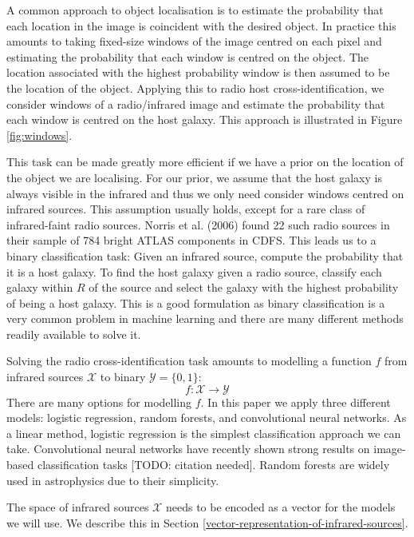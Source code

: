 \documentclass[fleqn,usenatbib,usedcolumn]{mnras}
\begin{document}
    A common approach to object localisation is to estimate the probability
    that each location in the image is coincident with the desired object. In
    practice this amounts to taking fixed-size windows of the image centred on
    each pixel and estimating the probability that each window is centred on
    the object. The location associated with the highest probability window is
    then assumed to be the location of the object. Applying this to radio host
    cross-identification, we consider windows of a radio/infrared image and
    estimate the probability that each window is centred on the host galaxy.
    This approach is illustrated in Figure \ref{fig:windows}.

    This task can be made greatly more efficient if we have a prior on the
    location of the object we are localising. For our prior, we assume that
    the host galaxy is always visible in the infrared and thus we only need
    consider windows centred on infrared sources. This assumption usually
    holds, except for a rare class of infrared-faint radio sources. Norris et
    al. (2006) found 22 such radio sources in their sample of 784 bright ATLAS
    components in CDFS. This leads us to a binary classification task: Given
    an infrared source, compute the probability that it is a host galaxy. To
    find the host galaxy given a radio source, classify each galaxy within
    \(R\) of the source and select the galaxy with the highest probability of
    being a host galaxy. This is a good formulation as binary classification
    is a very common problem in machine learning and there are many different
    methods readily available to solve it.

    Solving the radio cross-identification task amounts to modelling a
    function \(f\) from infrared sources \(\mathcal{X}\) to binary
    \(\mathcal{Y} = \{0, 1\}\): \[
        f : \mathcal{X} \to \mathcal{Y}
    \] There are many options for modelling \(f\). In this paper we apply
    three different models: logistic regression, random forests, and
    convolutional neural networks. As a linear method, logistic regression is
    the simplest classification approach we can take. Convolutional neural
    networks have recently shown strong results on image-based classification
    tasks [TODO: citation needed]. Random forests are widely used in
    astrophysics due to their simplicity.

    The space of infrared sources \(\mathcal{X}\) needs to be encoded as a
    vector for the models we will use. We describe this in Section
    \ref{vector-representation-of-infrared-sources}.
\end{document}
